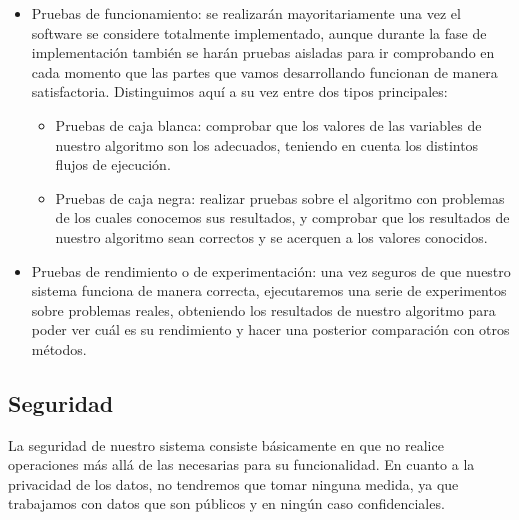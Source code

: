 \begin{itemize}
	\item Pruebas de funcionamiento: se realizarán mayoritariamente una vez el software se considere totalmente implementado, aunque durante la fase de implementación también se harán pruebas aisladas para ir comprobando en cada momento que las partes que vamos desarrollando funcionan de manera satisfactoria. Distinguimos aquí a su vez entre dos tipos principales:
	\begin{itemize}
		\item Pruebas de caja blanca: comprobar que los valores de las variables de nuestro algoritmo son los adecuados, teniendo en cuenta los distintos flujos de ejecución.
		\item Pruebas de caja negra: realizar pruebas sobre el algoritmo con problemas de los cuales conocemos sus resultados, y comprobar que los resultados de nuestro algoritmo sean correctos y se acerquen a los valores conocidos.
	\end{itemize}
	\item Pruebas de rendimiento o de experimentación: una vez seguros de que nuestro sistema funciona de manera correcta, ejecutaremos una serie de experimentos sobre problemas reales, obteniendo los resultados de nuestro algoritmo para poder ver cuál es su rendimiento y hacer una posterior comparación con otros métodos.
\end{itemize}

\subsection{Seguridad}
La seguridad de nuestro sistema consiste básicamente en que no realice operaciones más allá de las necesarias para su funcionalidad. En cuanto a la privacidad de los datos, no tendremos que tomar ninguna medida, ya que trabajamos con datos que son públicos y en ningún caso confidenciales.


